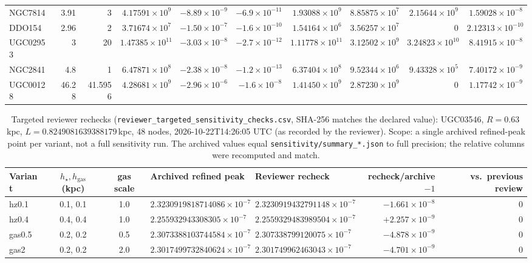 \documentclass[10pt,a4paper]{article}
\begin{document}
\begin{table}[!htbp]
\begin{tabular}{@{}lrrrrrrrrr@{}}
NGC7814 & 3.91 & 3 & $4.17591\times10^{9}$ & $-8.89\times10^{-9}$ & $-6.9\times10^{-11}$ & $1.93088\times10^{9}$ & $8.85875\times10^{7}$ & $2.15644\times10^{9}$ & $1.59028\times10^{-8}$\\
DDO154 & 2.96 & 2 & $3.71674\times10^{7}$ & $-1.50\times10^{-7}$ & $-1.6\times10^{-10}$ & $1.54164\times10^{6}$ & $3.56257\times10^{7}$ & 0 & $2.12313\times10^{-10}$\\
UGC02953 & 3 & 20 & $1.47385\times10^{11}$ & $-3.03\times10^{-8}$ & $-2.7\times10^{-12}$ & $1.11778\times10^{11}$ & $3.12502\times10^{9}$ & $3.24823\times10^{10}$ & $8.41915\times10^{-8}$\\
NGC2841 & 4.8 & 1 & $6.47871\times10^{8}$ & $-2.38\times10^{-8}$ & $-1.2\times10^{-13}$ & $6.37404\times10^{8}$ & $9.52344\times10^{6}$ & $9.43328\times10^{5}$ & $7.40172\times10^{-9}$\\
UGC00128 & 46.28 & 41.5956 & $4.28681\times10^{9}$ & $-2.96\times10^{-6}$ & $-1.6\times10^{-8}$ & $1.41450\times10^{9}$ & $2.87230\times10^{9}$ & 0 & $1.17742\times10^{-9}$\\
\bottomrule\end{tabular}\end{table}

\begin{table}[!htbp]\centering\scriptsize\setlength{\tabcolsep}{2.4pt}
\caption{Targeted reviewer rechecks (\texttt{reviewer\_targeted\_sensitivity\_checks.csv}, SHA-256 matches the declared value): UGC03546, $R=0.63$\,kpc, $L=0.8249081639388179$\,kpc, 48 nodes, 2026-10-22T14:26:05 UTC (as recorded by the reviewer). Scope: a single archived refined-peak point per variant, not a full sensitivity run. The archived values equal \texttt{sensitivity/summary\_*.json} to full precision; the relative columns were recomputed and match.}
\begin{tabular}{@{}lccllrr@{}}\toprule
Variant & $h_\star,h_\mathrm{gas}$ (kpc) & gas scale & Archived refined peak & Reviewer recheck & recheck/archive$-1$ & vs.\ previous review\\\midrule
hz0.1 & 0.1, 0.1 & 1.0 & $2.3230919818714086\times10^{-7}$ & $2.3230919432791148\times10^{-7}$ & $-1.661\times10^{-8}$ & 0\\
hz0.4 & 0.4, 0.4 & 1.0 & $2.255932943308305\times10^{-7}$ & $2.2559329483989504\times10^{-7}$ & $+2.257\times10^{-9}$ & 0\\
gas0.5 & 0.2, 0.2 & 0.5 & $2.3073388103744584\times10^{-7}$ & $2.307338799120075\times10^{-7}$ & $-4.878\times10^{-9}$ & 0\\
gas2 & 0.2, 0.2 & 2.0 & $2.3017499732840624\times10^{-7}$ & $2.301749962463043\times10^{-7}$ & $-4.701\times10^{-9}$ & 0\\\bottomrule
\end{tabular}\end{table}
\end{document}
